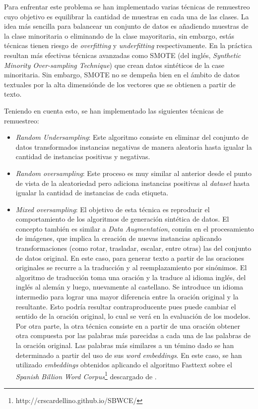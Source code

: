Para enfrentar este problema se han implementado varias técnicas de remuestreo cuyo objetivo es equilibrar la cantidad de muestras en cada una de las clases. La idea más sencilla para balancear un conjunto de datos es añadiendo muestras de la clase minoritaria o eliminando de la clase mayoritaria, sin embargo, estás técnicas tienen riesgo de \textit{overfitting} y \textit{underfitting} respectivamente. En la práctica resultan más efectivas técnicas avanzadas como SMOTE (del inglés, \textit{Synthetic Minority Over-sampling Technique}) que crean datos sintéticos de la case minoritaria. Sin embargo, SMOTE no se dempeña bien en el ámbito de datos textuales por la alta dimensiónde de los vectores que se obtienen a partir de texto.

Teniendo en cuenta esto, se han implementado las siguientes técnicas de remuestreo:

\begin{itemize}
  \item \textit{Random Undersampling}: Este algoritmo consiste en eliminar del conjunto de datos transformados instancias negativas de manera aleatoria hasta igualar la cantidad de instancias positivas y negativas.
  \item \textit{Random oversampling}: Este proceso es muy similar al anterior desde el punto de vista de la aleatoriedad pero adiciona instancias positivas al \textit{dataset} hasta igualar la cantidad de instancias de cada etiqueta.
  \item \textit{Mixed oversampling}: El objetivo de esta técnica es reproducir el comportamiento de los algoritmos de generación sintética de datos. El concepto también es similar a \textit{Data Augmentation}, común en el procesamiento de imágenes, que implica la creación de nuevas instancias aplicando transformaciones (como rotar, trasladar, escalar, entre otras) las del conjunto de datos original. En este caso, para generar texto a partir de las oraciones originales se recurre a la traducción y al reemplazamiento por sinónimos. El algoritmo de traducción toma una oración y la traduce al idioma inglés, del inglés al alemán y luego, nuevamente al castellano. Se introduce un idioma intermedio para lograr una mayor diferencia entre la oración original y la resultante. Esto podría resultar contraproducente pues puede cambiar el sentido de la oración original, lo cual se verá en la evaluación de los modelos. Por otra parte, la otra técnica consiste en a partir de una oración obtener otra compuesta por las palabras más parecidas a cada una de las palabras de la oración original. Las palabras más similares a un témino dado se han determinado a partir del uso de sus \textit{word embeddings}. En este caso, se han utilizado \textit{embeddings} obtenidos aplicando el algoritmo Fasttext sobre el \textit{Spanish Billion Word Corpus}\footnote{http://crscardellino.github.io/SBWCE/} descargado de \cite{spanish-word-embeddings}. 
\end{itemize}

